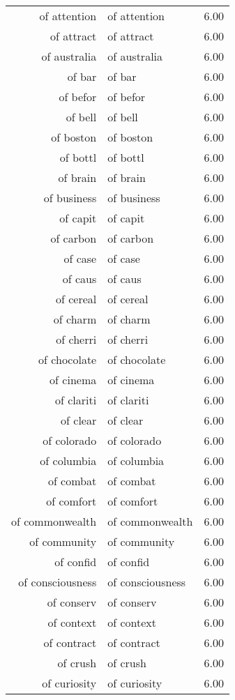 \begin{table}[ht]
\begin{tabular}{rlr}
  of attention & of attention & 6.00 \\ 
  of attract & of attract & 6.00 \\ 
  of australia & of australia & 6.00 \\ 
  of bar & of bar & 6.00 \\ 
  of befor & of befor & 6.00 \\ 
  of bell & of bell & 6.00 \\ 
  of boston & of boston & 6.00 \\ 
  of bottl & of bottl & 6.00 \\ 
  of brain & of brain & 6.00 \\ 
  of business & of business & 6.00 \\ 
  of capit & of capit & 6.00 \\ 
  of carbon & of carbon & 6.00 \\ 
  of case & of case & 6.00 \\ 
  of caus & of caus & 6.00 \\ 
  of cereal & of cereal & 6.00 \\ 
  of charm & of charm & 6.00 \\ 
  of cherri & of cherri & 6.00 \\ 
  of chocolate & of chocolate & 6.00 \\ 
  of cinema & of cinema & 6.00 \\ 
  of clariti & of clariti & 6.00 \\ 
  of clear & of clear & 6.00 \\ 
  of colorado & of colorado & 6.00 \\ 
  of columbia & of columbia & 6.00 \\ 
  of combat & of combat & 6.00 \\ 
  of comfort & of comfort & 6.00 \\ 
  of commonwealth & of commonwealth & 6.00 \\ 
  of community & of community & 6.00 \\ 
  of confid & of confid & 6.00 \\ 
  of consciousness & of consciousness & 6.00 \\ 
  of conserv & of conserv & 6.00 \\ 
  of context & of context & 6.00 \\ 
  of contract & of contract & 6.00 \\ 
  of crush & of crush & 6.00 \\ 
  of curiosity & of curiosity & 6.00 \\ 

\end{tabular}
\end{table}
